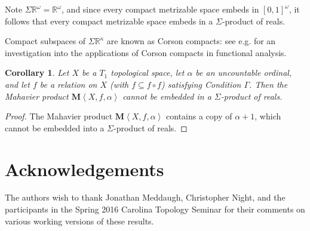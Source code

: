\documentclass{article}
\newcommand{\tuple}[1]{\left\langle{#1}\right\rangle}
\newcommand{\maProd}[1]{{\mathbf{M}}\tuple{#1}}
\theoremstyle{plain}
\newtheorem{corollary}[theorem]{Corollary}
\theoremstyle{definition}
\theoremstyle{remark}
\begin{document}
Note \(\Sigma\mathbb{R}^\omega=\mathbb{R}^\omega\), and
since every compact metrizable space embeds in \([0,1]^\omega\),
it follows that every compact metrizable space embeds in
a \(\Sigma\)-product of reals.

Compact subspaces of \(\Sigma\mathbb{R}^\kappa\) are known
as Corson compacts: see e.g. \cite{Corson} for
an investigation into the applications of Corson compacts in functional
analysis.

\begin{corollary}
  Let \(X\) be a \(T_1\) topological space, let
  \(\alpha\) be an uncountable ordinal, and let \(f\) be a relation on $X$ (with $f \subseteq f \circ f$)
  satisfying Condition \(\Gamma\). 
  Then the Mahavier product 
  \(\maProd{X,f,\alpha}\) cannot be embedded in a \(\Sigma\)-product
  of reals.
\end{corollary}
\begin{proof}
The Mahavier product \(\maProd{X,f,\alpha}\) contains a copy of \(\alpha+1\),
  which cannot be embedded into a \(\Sigma\)-product of reals.
\end{proof}

\section{Acknowledgements}

The authors wish to thank Jonathan Meddaugh, Christopher Night,
and the participants in the Spring 2016 Carolina
Topology Seminar for their comments on various working versions
of these results.
\end{document}
